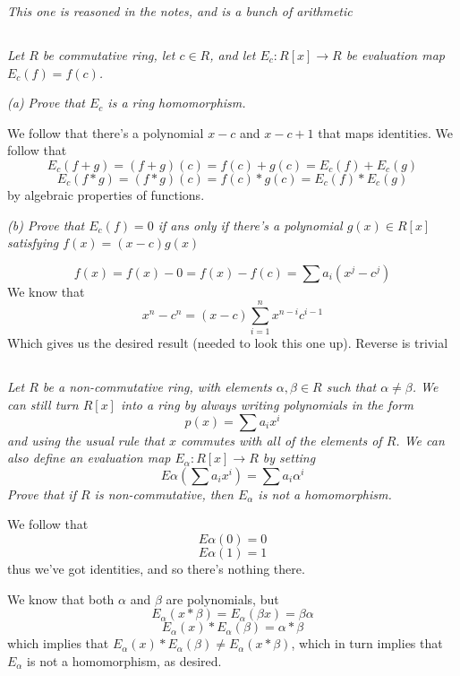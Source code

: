 \documentclass[11pt,oneside,titlepage]{book}
\begin{document}
\textit{This one is reasoned in the notes, and is a bunch of arithmetic}

\subsection{}

\textit{Let $R$ be commutative ring, let $c \in R$, and let $E_c: R[x]
  \to R$ be evaluation map $E_c(f) = f(c)$.}

\textit{(a) Prove that $E_c$ is a ring homomorphism.}

We follow that there's a polynomial $x - c$ and $x - c + 1$ that maps
identities.
We follow that
$$E_c(f + g) = (f + g)(c) = f(c) + g(c) = E_c(f) + E_c(g)$$
$$E_c(f * g) = (f * g)(c) = f(c) * g(c) = E_c(f) * E_c(g)$$
by algebraic properties of functions.

\textit{(b) Prove that $E_c(f) = 0$ if ans only if there's a
  polynomial $g(x) \in R[x]$ satisfying $f(x) = (x - c)g(x)$}

$$f(x) = f(x) - 0 = f(x) - f(c) = \sum{a_i (x^j - c^j)}$$
We know that
$$x^n - c^n = (x - c)\sum_{i = 1}^n{x^{n - i} c^{i - 1}}$$
Which gives us the desired result (needed to look this one up).
Reverse is trivial

\subsection{}

\textit{Let $R$ be a non-commutative ring, with elements $\alpha,
  \beta \in R$ such that $\alpha \neq \beta$. We can still turn $R[x]$
  into a ring by always writing polynomials in the form
  $$p(x) = \sum{a_i x^i}$$
  and using the usual rule that $x$ commutes with all of the elements
  of $R$.  We can also define an evaluation map $E_\alpha: R[x] \to R$
  by setting
  $$E\alpha(\sum{a_i x^i}) = \sum{a_i \alpha^i}$$
  Prove that if $R$ is non-commutative, then $E_\alpha$ is not a
  homomorphism.}

We follow that
$$E\alpha(0) = 0$$
$$E\alpha(1) = 1$$
thus we've got identities, and so there's nothing there.

We know that both $\alpha$ and $\beta$ are polynomials, but
$$E_\alpha(x * \beta) = E_\alpha(\beta x) = \beta \alpha$$
$$E_\alpha(x) * E_\alpha(\beta) = \alpha * \beta$$
which implies that $E_\alpha(x) * E_\alpha(\beta) \neq E_\alpha(x *
\beta)$, which in turn implies that $E_\alpha$ is not a homomorphism,
as desired.

\subsection{}
\end{document}
